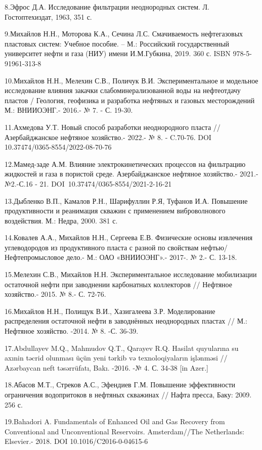 8.Эфрос Д.А. Исследование фильтрации неоднородных систем. Л.
Гостоптехиздат, 1963, 351 с.

9.Михайлов Н.Н., Моторова К.А., Сечина Л.С. Смачиваемость нефтегазовых
пластовых систем: Учебное пособие. -- М.: Российский государственный
университет нефти и газа (НИУ) имени И.М.Губкина, 2019. 360 с. ISBN
978-5-91961-313-8

10.Михайлов Н.Н., Мелехин С.В., Поличук В.И. Экспериментальное и
модельное исследование влияния закачки слабоминерализованной воды на
нефтеотдачу пластов / Геология, геофизика и разработка нефтяных и
газовых месторождений М.: ВНИИОЭНГ.- 2016.- № 7. - С. 19-30.

11.Ахмедова У.Т. Новый способ разработки неоднородного пласта //
Азербайджанское нефтяное хозяйство.- 2022.- № 8. - C.70-76. DOI
10.37474/0365-8554/2022-08-70-76

12.Мамед-заде А.М. Влияние электрокинетических процессов на фильтрацию
жидкостей и газа в пористой среде. Азербайджанское нефтяное хозяйство.-
2021.-№2.-С.16 - 21. DOI~10.37474/0365-8554/2021-2-16-21

13.Дыбленко В.П., Камалов Р.Н., Шарифуллин Р.Я, Туфанов И.А. Повышение
продуктивности и реанимация скважин с применением виброволнового
воздействия. М.: Недра, 2000. 381 с.

14.Ковалев А.А., Михайлов Н.Н., Сергеева Е.В. Физические основы
извлечения углеводородов из продуктивного пласта с разной по свойствам
нефтью/ Нефтепромысловое дело.- М.: ОАО «ВНИИОЭНГ».- 2017-. № 2.- С.
13-18.

15.Мелехин С.В., Михайлов Н.Н. Экспериментальное исследование
мобилизации остаточной нефти при заводнении карбонатных коллекторов //
Нефтяное хозяйство.- 2015. № 8.- С. 72-76.

16.Михайлов Н.Н., Полищук В.И., Хазигалеева З.Р. Моделирование
распределения остаточной нефти в заводнённых неоднородных пластах // М.:
Нефтяное хозяйство. -2014. № 8. -С. 36-39.

17.Abdullayev M.Q., Mahmudov Q.T., Qarayev R.Q. Hasilat quyularına su
axınin təcrid olunması üçün yeni tərkib və texnoloqiyaların işlənməsi //
Azərbaycan neft təsərrüfatı, Bakı. -2016. -№ 4. С. 34-38 {[}in Azer.{]}

18.Абасов М.Т., Стреков А.С., Эфендиев Г.М. Повышение эффективности
ограничения водопритоков в нефтяных скважинах // Нафта пресса, Баку:
2009. 256 с.

19.Bahadori A. Fundamentals of Enhanced Oil and Gas Recovery from
Conventional and Unconventional Reservoirs. Amsterdam//The Netherlands:
Elsevier.- 2018. DOI 10.1016/C2016-0-04615-6

